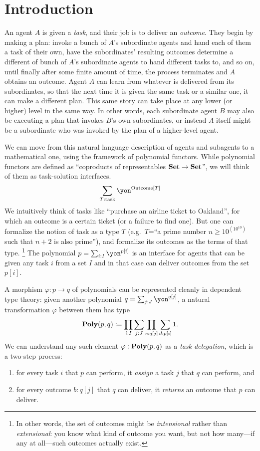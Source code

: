 \chapter{Introduction}\label{sec:intro}

An agent $A$ is given a \emph{task}, and their job is to deliver an \emph{outcome}. They begin by making a plan: invoke a bunch of $A$'s subordinate agents and hand each of them a task of their own, have the subordinates' resulting outcomes determine a different of bunch of $A$'s subordinate agents to hand different tasks to, and so on, until finally after some finite amount of time, the process terminates and $A$ obtains an outcome. Agent $A$ can learn from whatever is delivered from its subordinates, so that the next time it is given the same task or a similar one, it can make a different plan. This same story can take place at any lower (or higher) level in the same way. In other words, each subordinate agent $B$ may also be executing a plan that invokes $B$'s own subordinates, or instead $A$ itself might be a subordinate who was invoked by the plan of a higher-level agent.

We can move from this natural language description of agents and subagents to a mathematical one, using the framework of polynomial functors. While polynomial functors are defined as ``coproducts of representables $\mathbf{Set}\to\mathbf{Set}$'', we will think of them as task-solution interfaces.
\[
\sum_{T:\text{task}}\yon^{\text{Outcome}[T]}
\]
We intuitively think of tasks like ``purchase an airline ticket to Oakland'', for which an outcome is a certain ticket (or a failure to find one). But one can formalize the notion of task as a type $T$ (e.g.\ $T$=``a prime number $n\geq10^{(10^{10})}$ such that $n+2$ is also prime''), and formalize its outcomes as the terms of that type.%
\footnote{In other words, the set of outcomes might be \emph{intensional} rather than \emph{extensional}: you know what kind of outcome you want, but not how many---if any at all---such outcomes actually exist.} The polynomial $p=\sum_{i:I}\yon^{p[i]}$ is an interface for agents that can be given any task $i$ from a set $I$ and in that case can deliver outcomes from the set $p[i]$.

A morphism $\varphi\colon p\to q$ of polynomials can be represented cleanly in dependent type theory: given another polynomial $q=\sum_{j:J}\yon^{q[j]}$, a natural transformation $\varphi$ between them has type
\[
\mathbf{Poly}(p,q)\coloneqq\prod_{i:I}\sum_{j:J}\prod_{e:q[j]}\sum_{d:p[i]}1.
\]
We can understand any such element $\varphi:\mathbf{Poly}(p,q)$ as a \emph{task delegation}, which is a two-step process: 
\begin{enumerate}
\item for every task $i$ that $p$ can perform, it \emph{assign} a task $j$ that $q$ can perform, and
\item for every outcome $b:q[j]$ that $q$ can deliver, it \emph{returns} an outcome that $p$ can deliver.
\end{enumerate}

